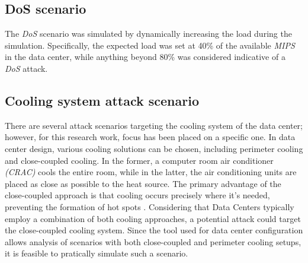 \subsection{DoS scenario}
The \emph{DoS} scenario was simulated by dynamically increasing the load during the simulation. Specifically, the expected load was set at 40\% of the available \emph{MIPS} in the data center, while anything beyond 80\% was considered indicative of a \emph{DoS} attack.

\subsection{Cooling system attack scenario} \label{subsection:coolingsystemattack}
There are several attack scenarios targeting the cooling system of the data center; however, for this research work, focus has been placed on a specific one. In data center design, various cooling solutions can be chosen, including perimeter cooling and close-coupled cooling. In the former, a computer room air conditioner \emph{(CRAC)} cools the entire room, while in the latter, the air conditioning units are placed as close as possible to the heat source. The primary advantage of the close-coupled approach is that cooling occurs precisely where it's needed, preventing the formation of hot spots \cite{anixter}.
Considering that Data Centers typically employ a combination of both cooling approaches, a potential attack could target the close-coupled cooling system. Since the tool used for data center configuration allows analysis of scenarios with both close-coupled and perimeter cooling setups, it is feasible to pratically simulate such a scenario. 

